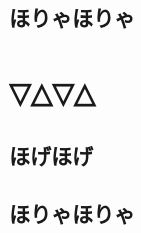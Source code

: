 \documentclass[12pt,epsf]{jreport}
\begin{document}
\section{ほりゃほりゃ}
\chapter{▽△▽△}
\section{ほげほげ}
\section{ほりゃほりゃ}


\end{document}
